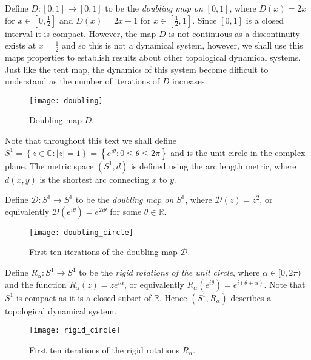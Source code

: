 \begin{exmp} \label{exmp:doubling-map}
    Define $D: [0,1] \to [0,1]$ to be the \emph{doubling map on} $[0, 1]$, where $D(x) = 2x$ for $x \in \left[0, \frac{1}{2}\right]$ and $D(x) = 2x - 1$ for $x \in \left[\frac{1}{2}, 1\right]$. Since $[0, 1]$ is a closed interval it is compact. However, the map $D$ is not continuous as a discontinuity exists at $x = \frac{1}{2}$ and so this is not a dynamical system, however, we shall use this maps properties to establish results about other topological dynamical systems. Just like the tent map, the dynamics of this system become difficult to understand as the number of iterations of $D$ increases.

    \begin{figure}[h]
        \centering
        \texttt{[image: doubling]}
        \caption{Doubling map $D$.}
        \label{fig:doubling}
    \end{figure}
\end{exmp}

Note that throughout this text we shall define $S^1 = \left\lbrace z \in \mathbb{C}: |z| = 1 \right\rbrace = \left\lbrace e^{i\theta} : 0 \leq \theta \leq 2\pi \right\rbrace$ and is the unit circle in the complex plane. The metric space $(S^1, d)$ is defined using the arc length metric, where $d(x, y)$ is the shortest arc connecting $x$ to $y$. 

\begin{exmp} \label{exmp:doubling-map-s1}
    Define $\mathcal{D}: S^1 \to S^1$ to be the \emph{doubling map on} $S^1$, where $\mathcal{D}(z) = z^2$, or equivalently $\mathcal{D}(e^{i\theta}) = e^{2i\theta}$ for some $\theta \in \mathbb{R}$.

    \begin{figure}[h]
        \centering
        \texttt{[image: doubling\_circle]}
        \caption{First ten iterations of the doubling map $\mathcal{D}$.}
        \label{fig:doubling-circle}
    \end{figure}
\end{exmp}

\begin{exmp} \label{exmp:rigid-rotations}
    Define $R_\alpha: S^1 \to S^1$ to be the \emph{rigid rotations of the unit circle}, where $\alpha \in [0, 2\pi)$ and the function $R_{\alpha}(z) = ze^{i\alpha}$, or equivalently $R_\alpha(e^{i\theta}) = e^{i(\theta + \alpha)}$. Note that $S^1$ is compact as it is a closed subset of $\mathbb{R}$. Hence $(S^1, R_{\alpha})$ describes a topological dynamical system.

    \begin{figure}[h]
        \centering
        \texttt{[image: rigid\_circle]}
        \caption{First ten iterations of the rigid rotations $R_\alpha$.}
        \label{fig:rigid-circle}
    \end{figure}
\end{exmp}

